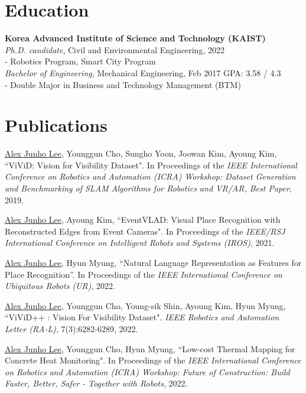 \documentclass[margin]{res}
\begin{document}
	\begin{resume}
		
		\section{Education}
		\textbf{Korea Advanced Institute of Science and Technology (KAIST)}\\
		{\sl Ph.D. candidate}, Civil and Environmental Engineering, 2022
		\\- Robotics Program, Smart City Program
		\\
		{\sl Bachelor of Engineering}, Mechanical Engineering, Feb 2017
		\hfill GPA: 3.58 / 4.3
		\\- Double Major in Business and Technology Management (BTM)
		\section{Publications}
		
		\par\underline{Alex Junho Lee}, Younggun Cho, Sungho Yoon, Joowan Kim, Ayoung Kim, ``ViViD: Vision for Visibility Dataset". In Proceedings of the \textit{IEEE International Conference on Robotics and Automation (ICRA) Workshop: Dataset Generation and Benchmarking of SLAM Algorithms for Robotics and VR/AR, Best Paper}, 2019.
			
		\par\underline{Alex Junho Lee}, Ayoung Kim, ``EventVLAD: Visual Place Recognition with Reconstructed Edges from Event Cameras". In Proceedings of the \textit{IEEE/RSJ International Conference on Intelligent Robots and Systems (IROS)}, 2021.
			
		\par\underline{Alex Junho Lee}, Hyun Myung, ``Natural Language Representation as Features for Place Recognition''. In Proceedings of the \textit{IEEE International Conference on Ubiquitous Robots (UR)}, 2022.
			
		\par\underline{Alex Junho Lee}, Younggun Cho, Young-sik Shin, Ayoung Kim, Hyun Myung, ``ViViD++ : Vision For Visibility Dataset". \textit{IEEE Robotics and Automation Letter (RA-L)}, 7(3):6282-6289, 2022.
			
		\par\underline{Alex Junho Lee}, Younggun Cho, Hyun Myung, ``Low-cost Thermal Mapping for Concrete Heat Monitoring". In Proceedings of the \textit{IEEE International Conference on Robotics and Automation (ICRA) Workshop: Future of Construction: Build Faster, Better, Safer - Together with Robots}, 2022.
		

\end{resume}
\end{document}
